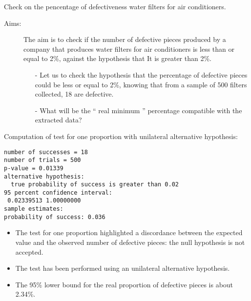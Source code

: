 

\begin{frame} 
  Check on the pencentage of defectiveness water filters for air conditioners.
  \begin{description}
    \item[Aims:]
      \begin{small}
        The aim is to check if the number of defective pieces produced by a company that produces water filters for air conditioners is less than or equal to 2\%, against the hypothesis that It is greater than 2\%. 
        \begin{itemize}
          \item[-] Let us to check the hypothesis that the percentage of defective pieces could be less or equal to 2\%, knowing that from a sample of 500 filters collected, 18 are defective.
          \item[-] What will be the `` real minimum '' percentage compatible with the extracted data?
        \end{itemize}
      \end{small}
  \end{description}
\end{frame}

\begin{frame}[fragile]
  Computation of test for one proportion with unilateral alternative hypothesis: 
  \begin{verbatim}
number of successes = 18
number of trials = 500
p-value = 0.01339
alternative hypothesis: 
  true probability of success is greater than 0.02
95 percent confidence interval:
 0.02339513 1.00000000
sample estimates:
probability of success: 0.036 
  \end{verbatim}
\end{frame}

\begin{frame}
  \begin{itemize}
    \item The test for one proportion highlighted a discordance between the expected value and the observed number of defective pieces: the null hypothesis is not accepted.
    \vspace{0.75cm}
    \item The test has been performed using an unilateral alternative hypothesis.
    \vspace{0.75cm}
    \item The 95\% lower bound for the real proportion of defective pieces is about 2.34\%.
  \end{itemize}
\end{frame}

